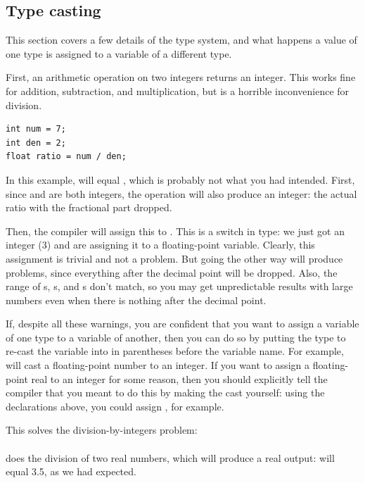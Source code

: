 \documentclass[12pt]{article}
\begin{document}
\subsection{Type casting}\label{casting}   
This section covers a few details of the type system, and what happens
a value of one type is assigned to a variable of a different type.

First, an arithmetic operation on two integers returns an integer. This works fine for
addition, subtraction, and multiplication, but is a horrible inconvenience for division.\\
\begin{lstlisting}
int num = 7;
int den = 2;
float ratio = num / den;
\end{lstlisting}
In this example,  will equal , which is probably not what you had intended. 
First, since  and  are both integers, the operation
 will also produce an integer: the actual ratio with the
fractional part dropped.

Then, the compiler will assign this to . This is a switch in type: we just got an integer (3)
and are assigning it to a floating-point variable. Clearly, this assignment is trivial and not a problem.
But going the other way will produce problems, since everything after the decimal point will be
dropped.
Also, the range of s, s, and s don't match, so you may get unpredictable
results with large numbers even when there is nothing after the decimal point.


If, despite all these warnings, you are confident that you want to assign a variable of one type
to a variable of another, then you can do so by putting the type to
re-cast the variable into in parentheses before the variable name. For
example,  will cast a floating-point number to an integer. 
If you want to assign a floating-point real to an integer for some reason, then you should explicitly tell
the compiler that you meant to do this by making the cast yourself: using the declarations above, 
you could assign , for example. 

This solves the division-by-integers problem: \\
\\
does the division of two real numbers, which will produce a real output:  will equal 3.5, as we
had expected.
\end{document}
